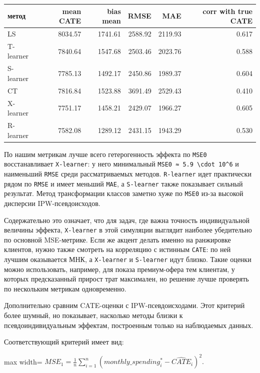 \documentclass[11pt]{article}
\newcounter{none}
\begin{document}
{\def\LTcaptype{none} %
\begin{longtable}[]{@{}lrrrrr@{}}
\toprule\noalign{}
метод & mean CATE & bias mean & RMSE & MAE & corr with true CATE \\
\midrule\noalign{}
\endhead
\bottomrule\noalign{}
\endlastfoot
LS & 8034.57 & 1741.61 & 2588.92 & 2119.93 & 0.617 \\
T-learner & 7840.64 & 1547.68 & 2503.46 & 2023.76 & 0.588 \\
S-learner & 7785.13 & 1492.17 & 2450.86 & 1989.37 & 0.604 \\
CT & 7816.84 & 1523.88 & 3691.49 & 2529.43 & 0.410 \\
X-learner & 7751.17 & 1458.21 & 2429.07 & 1966.27 & 0.605 \\
R-learner & 7582.08 & 1289.12 & 2431.15 & 1943.29 & 0.530 \\
\end{longtable}
}

    По нашим метрикам лучше всего гетерогенность эффекта по \texttt{MSE0}
восстанавливает \texttt{X-learner}: у него минимальный
\texttt{MSE0\ ≈\ 5.9\ \textbackslash{}cdot\ 10\^{}6} и наименьший
\texttt{RMSE} среди рассматриваемых методов. \texttt{R-learner} идет
практически рядом по \texttt{RMSE} и имеет меньший \texttt{MAE}, а
\texttt{S-learner} также показывает сильный результат. Метод
трансформации классов заметно хуже по \texttt{MSE0} из-за высокой
дисперсии IPW-псевдоисходов.

Содержательно это означает, что для задач, где важна точность
индивидуальной величины эффекта, \texttt{X-learner} в этой симуляции
выглядит наиболее убедительно по основной MSE-метрике. Если же акцент
делать именно на ранжировке клиентов, нужно также смотреть на корреляцию
с истинным \texttt{CATE}: по ней лучшим оказывается МНК, а
\texttt{X-learner} и \texttt{S-learner} идут близко. Такие оценки можно
использовать, например, для показа премиум-офера тем клиентам, у которых
предсказанный прирост трат максимален, но решение лучше проверять по
нескольким метрикам одновременно.

    Дополнительно сравним CATE-оценки с IPW-псевдоисходами. Этот критерий
более шумный, но показывает, насколько методы близки к
псевдоиндивидуальным эффектам, построенным только на наблюдаемых данных.

Соответствующий критерий имеет вид:

\begin{center}
\begin{adjustbox}{max width=\linewidth}
\(\displaystyle MSE_1 = \frac{1}{n}\sum\limits_{i=1}^{n}(monthly\_spending_i^{*} - \widehat{CATE}_i)^2.\)
\end{adjustbox}
\end{center}
\end{document}
